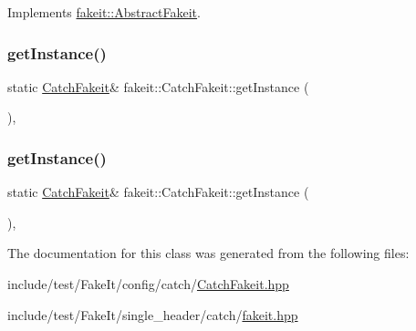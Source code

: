 Implements \mbox{\hyperlink{classfakeit_1_1AbstractFakeit_a9476180a503524d49d1978fbbc125b01}{fakeit\+::\+Abstract\+Fakeit}}.

\mbox{\label{classfakeit_1_1CatchFakeit_a1e62f65c45997371254a7c3932dbf968}} 
\subsubsection{\texorpdfstring{getInstance()}{getInstance()}\hspace{0.1cm}{\footnotesize\ttfamily [1/2]}}
{\footnotesize\ttfamily static \mbox{\hyperlink{classfakeit_1_1CatchFakeit}{Catch\+Fakeit}}\& fakeit\+::\+Catch\+Fakeit\+::get\+Instance (\begin{DoxyParamCaption}{ }\end{DoxyParamCaption})\hspace{0.3cm}{\ttfamily [inline]}, {\ttfamily [static]}}

\mbox{\label{classfakeit_1_1CatchFakeit_a1e62f65c45997371254a7c3932dbf968}} 
\subsubsection{\texorpdfstring{getInstance()}{getInstance()}\hspace{0.1cm}{\footnotesize\ttfamily [2/2]}}
{\footnotesize\ttfamily static \mbox{\hyperlink{classfakeit_1_1CatchFakeit}{Catch\+Fakeit}}\& fakeit\+::\+Catch\+Fakeit\+::get\+Instance (\begin{DoxyParamCaption}{ }\end{DoxyParamCaption})\hspace{0.3cm}{\ttfamily [inline]}, {\ttfamily [static]}}



The documentation for this class was generated from the following files\+:\begin{DoxyCompactItemize}
\item 
include/test/\+Fake\+It/config/catch/\mbox{\hyperlink{CatchFakeit_8hpp}{Catch\+Fakeit.\+hpp}}\item 
include/test/\+Fake\+It/single\+\_\+header/catch/\mbox{\hyperlink{single__header_2catch_2fakeit_8hpp}{fakeit.\+hpp}}\end{DoxyCompactItemize}
